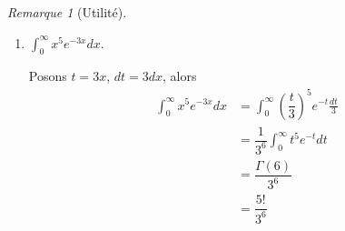 \documentclass{report}
\newcommand*{\dint}[3]{\displaystyle\int_{#1}^{#2}#3}
\theoremstyle{definition}
\theoremstyle{remark}
\newtheorem*{rema}{Remarque}
\begin{document}
\begin{rema}[Utilit\'e]
\begin{enumerate}[label=\alph*)]
			On en d\'eduit que $f_{T_1} = \dfrac{d}{dt}F_{T_1} = \lambda e^{-\lambda t}$.

			Ainsi, $T_1 \sim \exp(\lambda)$.

			De m\^eme, si $T_i$ d\'esigne le temps entre le $(i-1)$\textsuperscript{\`eme} d\'ec\`es et le $i$\textsuperscript{\`eme} d\'ec\`es, on peut montrer que $\{T_i\}$ sont iid $\exp(\lambda)$.

			On cherche \`a trouver le temps moyen pour avoir $4$ d\'ec\`es \`a partir d'un moment donn\'e.
			\begin{align*}
				E\left[T_{i_0} + T_{i_0+1} + T_{i_0+2} + T_{i_0+3}\right]&= E\left[\Gamma(4, 24)\right]\\
				&= \frac{4}{24} = \frac{2}{12}
			\end{align*}

			Il faut donc en moyenne $2$ mois pour avoir $4$ d\'ec\`es.
			\item $\dint{0}{\infty}{x^5e^{-3x}dx}$.

			Posons $t=3x$, $dt=3dx$, alors
			\begin{align*}
				\dint{0}{\infty}{x^5e^{-3x}dx}&= \dint{0}{\infty}{\left(\dfrac{t}{3}\right)^5e^{-t} \frac{dt}{3}}\\
				&= \dfrac{1}{3^6} \dint{0}{\infty}{t^5e^{-t}dt}\\
				&= \dfrac{\Gamma(6)}{3^6}\\
				&= \dfrac{5!}{3^6}
			\end{align*}
		\end{enumerate}
	\end{rema}
\end{document}
